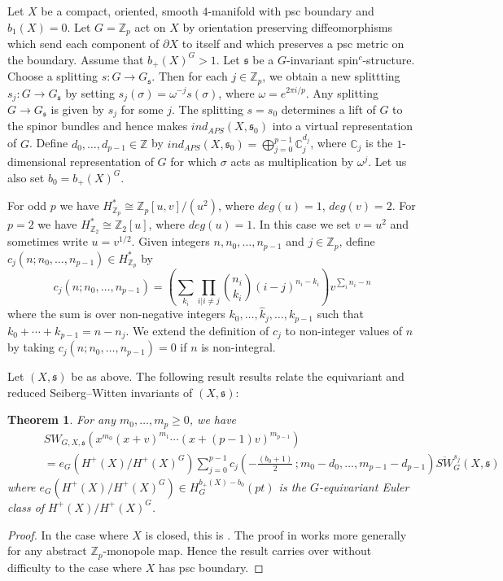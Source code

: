 \documentclass{amsart}
\newtheorem{theorem}{Theorem}[section]
\theoremstyle{definition}
\theoremstyle{remark}
\numberwithin{equation}{section}
\begin{document}
Let $X$ be a compact, oriented, smooth $4$-manifold with psc boundary and $b_1(X) = 0$. Let $G = \mathbb{Z}_p$ act on $X$ by orientation preserving diffeomorphisms which send each component of $\partial X$ to itself and which preserves a psc metric on the boundary. Assume that $b_+(X)^G > 1$. Let $\mathfrak{s}$ be a $G$-invariant spin$^c$-structure. Choose a splitting $s : G \to G_{\mathfrak{s}}$. Then for each $j \in \mathbb{Z}_p$, we obtain a new splittting $s_j : G \to G_{\mathfrak{s}}$ by setting $s_j(\sigma) = \omega^{-j} s(\sigma)$, where $\omega = e^{2\pi i/p}$. Any splitting $G \to G_{\mathfrak{s}}$ is given by $s_j$ for some $j$. The splitting $s = s_0$ determines a lift of $G$ to the spinor bundles and hence makes $ind_{APS}(X , \mathfrak{s}_0)$ into a virtual representation of $G$. Define $d_0, \dots , d_{p-1} \in \mathbb{Z}$ by $ind_{APS}(X , \mathfrak{s}_0) = \bigoplus_{j=0}^{p-1} \mathbb{C}_j^{d_j}$, where $\mathbb{C}_j$ is the $1$-dimensional representation of $G$ for which $\sigma$ acts as multiplication by $\omega^j$. Let us also set $b_0 = b_+(X)^G$.


For odd $p$ we have $H^*_{\mathbb{Z}_p} \cong \mathbb{Z}_p[u,v]/(u^2)$, where $deg(u) = 1$, $deg(v)=2$. For $p=2$ we have $H^*_{\mathbb{Z}_2} \cong \mathbb{Z}_2[u]$, where $deg(u) = 1$. In this case we set $v = u^2$ and sometimes write $u = v^{1/2}$. Given integers $n,n_0, \dots , n_{p-1}$ and $j \in \mathbb{Z}_p$, define $c_j(n ; n_0 , \dots , n_{p-1}) \in H^*_{\mathbb{Z}_p}$ by
\[
c_j(n ; n_0 , \dots , n_{p-1}) = \left( \sum_{k_i} \prod_{i | i \neq j} \binom{n_i}{k_i} (i-j)^{n_i-k_i} \right) v^{\sum_i n_i - n}
\]
where the sum is over non-negative integers $k_0 , \dots , \hat{k}_j , \dots , k_{p-1}$ such that $k_0 + \cdots + k_{p-1} = n-n_j$. We extend the definition of $c_j$ to non-integer values of $n$ by taking $c_j(n ; n_0 , \dots , n_{p-1}) = 0$ if $n$ is non-integral.

Let $(X,\mathfrak{s})$ be as above. The following result results relate the equivariant and reduced Seiberg--Witten invariants of $(X, \mathfrak{s})$:

\begin{theorem}\label{thm:eqre}
For any $m_0, \dots , m_p \ge 0$, we have
\begin{align*}
& SW_{G , X , \mathfrak{s}}( x^{m_0} (x+v)^{m_1} \cdots (x+(p-1)v)^{m_{p-1}}) \\
\quad \quad &= e_{G}( H^+(X)/H^+(X)^G ) \sum_{j=0}^{p-1} c_j\left( -\frac{ (b_0+1) }{2} \, ; m_0-d_0 , \dots , m_{p-1} - d_{p-1} \right) \overline{SW}^{s_j}_{G}(X , \mathfrak{s})
\end{align*}
where $e_{G}( H^+(X)/H^+(X)^G) \in H_{G}^{b_+(X) - b_0}(pt)$ is the $G$-equivariant Euler class of $H^+(X)/H^+(X)^G$.
\end{theorem}
\begin{proof}
In the case where $X$ is closed, this is \cite[Theorem 6.12]{bar}. The proof in \cite{bar} works more generally for any abstract $\mathbb{Z}_p$-monopole map. Hence the result carries over without difficulty to the case where $X$ has psc boundary.
\end{proof}
\end{document}
